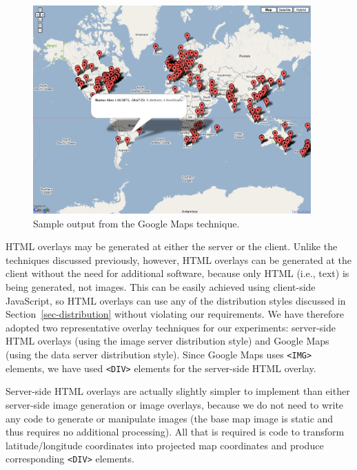 \documentclass[acmtocl,acmnow]{acmtrans2m}
\begin{document}
\begin{figure}
	\begin{center}
		\includegraphics[width=0.95\textwidth,keepaspectratio]{GoogleMap-full.png}
	\end{center}
	\caption{Sample output from the Google Maps technique.}
	\label{fig-google}
\end{figure}


HTML overlays may be generated at either the server or the client.
Unlike the techniques discussed previously, however, HTML overlays can
be generated at the client without the need for additional software,
because only HTML (i.e., text) is being generated, not images. This can
be easily achieved using client-side JavaScript, so HTML overlays can
use any of the distribution styles discussed in
Section~\ref{sec-distribution} without violating our requirements. We
have therefore adopted two representative overlay techniques for our
experiments: server-side HTML overlays (using the image server
distribution style) and Google Maps (using the data server distribution
style). Since Google Maps uses \verb|<IMG>| elements, we have used
\verb|<DIV>| elements for the server-side HTML overlay.

Server-side HTML overlays are actually slightly simpler to implement
than either server-side image generation or image overlays, because we
do not need to write any code to generate or manipulate images (the base
map image is static and thus requires no additional processing). All
that is required is code to transform latitude/longitude coordinates
into projected map coordinates and produce corresponding \verb|<DIV>|
elements.
\end{document}
